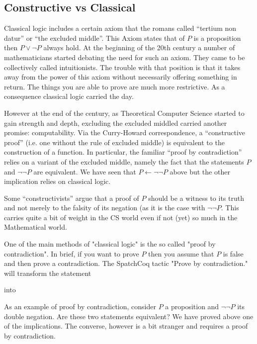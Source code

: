 \subsection{Constructive vs Classical}\label{subs:Constructive vs Classical}

Classical logic includes a certain axiom that the romans called ``tertium non datur'' or ``the excluded middle''. This Axiom states that of $P$ is a proposition then $P\lor \neg P$ always hold. At the beginning of the 20th century a number of mathematicians started debating the need for such an axiom. They came to be collectively called intuitionists. The trouble with that position is that it takes away from the power of this axiom without necessarily offering something in return. The things you are able to prove are much more restrictive. As a consequence classical logic carried the day.

However at the end of the century, as Theoretical Computer Science started to gain strength and depth, excluding the excluded middled carried another promise: computability. Via the Curry-Howard correspondence, a ``constructive proof'' (i.e. one without the rule of excluded middle) is equivalent to the construction of a function. In particular, the familiar ``proof by contradiction'' relies on a variant of the excluded middle, namely the fact that the statements $P$ and $\neg \neg P$ are equivalent. We have seen that $P \leftarrow \neg \neg P$ above but the other implication relies on classical logic.

Some ``constructivists'' argue that a proof of $P$ should be a witness to its truth and not merely to the falsity of its negation (as it is the case with $\neg \neg P$. This carries quite a bit of weight in the CS world even if not (yet) so much in the Mathematical world.

One of the main methods of "classical logic" is the so called "proof by contradiction". In brief, if you want to prove $P$ then you assume that $P$ is false and then prove a contradiction. The SpatchCoq tactic 
"Prove by contradiction." will transform the statement


into 


As an example of proof by contradiction, consider $P$ a proposition and $\neg \neg P$ its double negation. Are these two statements equivalent? We have proved above one of the implications. The converse, however is a bit stranger and requires a proof by contradiction.

